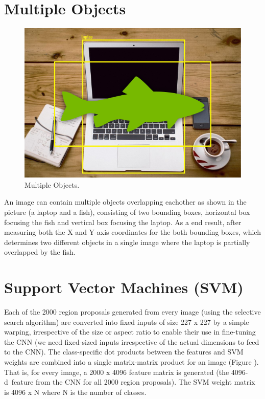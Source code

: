 \documentclass[a4paper,13pt,twoside]{book}
\begin{document}
\section{Multiple Objects}

\begin{figure}[H]
  \includegraphics[width=\linewidth]{Images/multipleobjects28.png}
  \caption{Multiple Objects.}
  \label{fig:Multiple Objects}
\end{figure}

An image can contain multiple objects overlapping eachother as shown in the picture (a laptop and a fish), consisting of two bounding boxes, horizontal box focusing the fish and vertical box focusing the laptop.
As a end result, after measuring both the X and Y-axis coordinates for the both bounding boxes, which determines two different objects in a single image where the laptop is partially overlapped by the fish.

\section{Support Vector Machines (SVM)}

Each of the 2000 region proposals generated from every image (using the selective search algorithm) are converted into fixed inputs of size 227 x 227 by a simple warping, irrespective of the size or aspect ratio to enable their use in fine-tuning the CNN (we need fixed-sized inputs irrespective of the actual dimensions to feed to the CNN).
The class-specific dot products between the features and SVM weights are combined into a single matrix-matrix product for an image (Figure ). That is, for every image, a 2000 x 4096 feature matrix is generated (the 4096-d feature from the CNN for all 2000 region proposals). The SVM weight matrix is 4096 x N where N is the number of classes.
\end{document}
